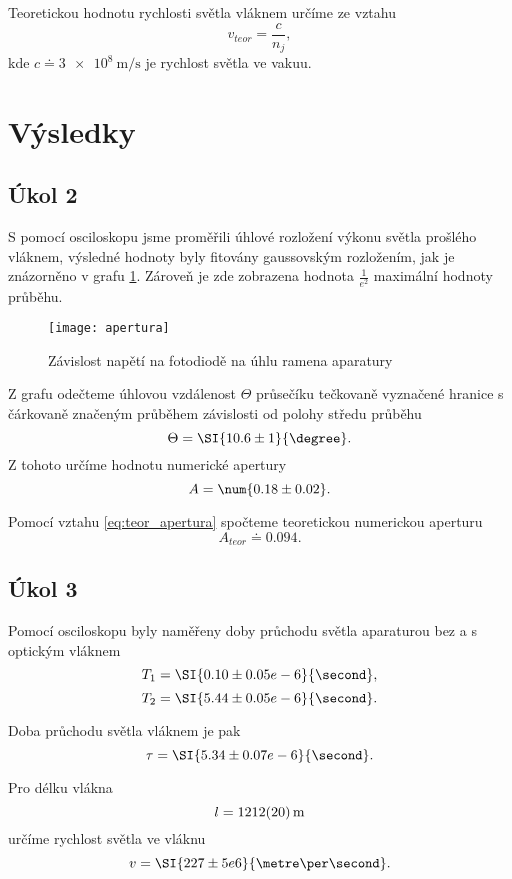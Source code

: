 \documentclass{protokol}
\begin{document}
    Teoretickou hodnotu rychlosti světla vláknem určíme ze vztahu
    \begin{equation} \label{eq:v_teor}
      v_{teor} = \frac{c}{n_j},  
    \end{equation} 
    kde $c \doteq \SI{3e8}{\metre\per\second}$ je rychlost světla ve vakuu.

  \section*{Výsledky}

    \subsection*{Úkol 2}

      S pomocí osciloskopu jsme proměřili úhlové rozložení výkonu světla prošlého vláknem, výsledné hodnoty byly fitovány gaussovským rozložením, jak je znázorněno v grafu \ref{fig:apertura}. Zároveň je zde zobrazena hodnota $\frac{1}{e^2}$ maximální hodnoty průběhu.

      \begin{figure}[H]
        \centering
        \texttt{[image: apertura]}
        \caption{Závislost napětí na fotodiodě na úhlu ramena aparatury}
        \label{fig:apertura}
      \end{figure}

      Z grafu odečteme úhlovou vzdálenost $\Theta$ průsečíku tečkovaně vyznačené hranice s čárkovaně značeným průběhem závislosti od polohy středu průběhu
      $$ \Theta = \SI{10.6 \pm 1}{\degree}. $$
      Z tohoto určíme hodnotu numerické apertury
      $$ A = \num{0.18 \pm 0.02}. $$

      Pomocí vztahu \eqref{eq:teor_apertura} spočteme teoretickou numerickou aperturu
      $$ A_{teor} \doteq \num{0.094}. $$ 
 
    \subsection*{Úkol 3}

      Pomocí osciloskopu byly naměřeny doby průchodu světla aparaturou bez a s optickým vláknem
      $$ T_1 = \SI{0.10 \pm 0.05 e-6}{\second}, $$
      $$ T_2 = \SI{5.44 \pm 0.05 e-6}{\second}. $$

      Doba průchodu světla vláknem je pak 
      $$ \tau = \SI{5.34 \pm 0.07 e-6}{\second}. $$

      Pro délku vlákna 
      $$ l = \SI{1212 \pm 20}{m} $$
      určíme rychlost světla ve vláknu 
      $$ v = \SI{227 \pm 5 e6}{\metre\per\second}. $$
\end{document}
